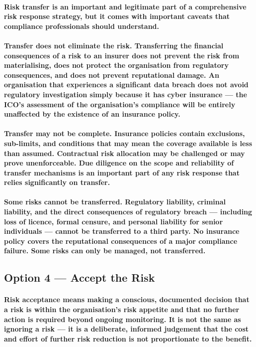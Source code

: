 \paragraph{Risk transfer is an important and legitimate part of a comprehensive risk response strategy, but it comes with important caveats that compliance professionals should understand.}
\paragraph{\textbf{Transfer does not eliminate the risk}. Transferring the financial consequences of a risk to an insurer does not prevent the risk from materialising, does not protect the organisation from regulatory consequences, and does not prevent reputational damage. An organisation that experiences a significant data breach does not avoid regulatory investigation simply because it has cyber insurance — the ICO's assessment of the organisation's compliance will be entirely unaffected by the existence of an insurance policy.}
\paragraph{\textbf{Transfer may not be complete}. Insurance policies contain exclusions, sub-limits, and conditions that may mean the coverage available is less than assumed. Contractual risk allocation may be challenged or may prove unenforceable. Due diligence on the scope and reliability of transfer mechanisms is an important part of any risk response that relies significantly on transfer.}
\paragraph{\textbf{Some risks cannot be transferred}. Regulatory liability, criminal liability, and the direct consequences of regulatory breach — including loss of licence, formal censure, and personal liability for senior individuals — cannot be transferred to a third party. No insurance policy covers the reputational consequences of a major compliance failure. Some risks can only be managed, not transferred.}

\subsection{Option 4 — Accept the Risk}
\paragraph{\textbf{Risk acceptance} means making a conscious, documented decision that a risk is within the organisation's risk appetite and that no further action is required beyond ongoing monitoring. It is not the same as ignoring a risk — it is a deliberate, informed judgement that the cost and effort of further risk reduction is not proportionate to the benefit.}
